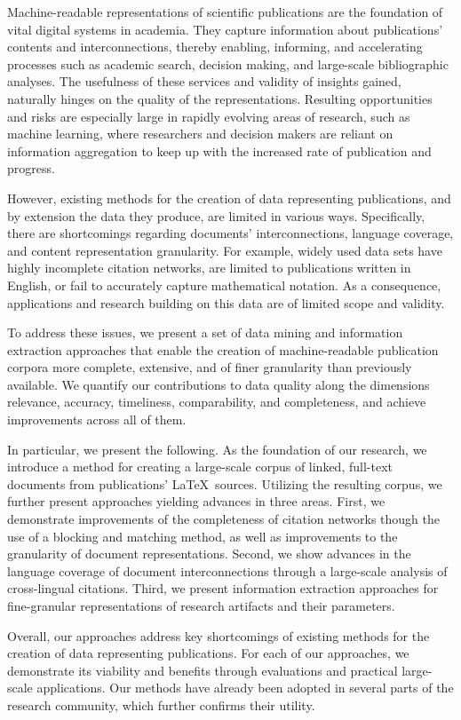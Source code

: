 \Abstract{}
Machine-readable representations of scientific publications are the foundation of vital digital systems in academia.
They capture information about publications' contents and interconnections, thereby enabling, informing, and accelerating processes such as academic search, decision making, and large-scale bibliographic analyses.
The usefulness of these services and validity of insights gained, naturally hinges on the quality of the representations.
Resulting opportunities and risks are especially large in rapidly evolving areas of research, such as machine learning, where researchers and decision makers are reliant on information aggregation to keep up with the increased rate of publication and progress.

However, existing methods for the creation of data representing publications, and by extension the data they produce, are limited in various ways. Specifically, there are shortcomings regarding documents' interconnections, language coverage, and content representation granularity. For example, widely used data sets have highly incomplete citation networks, are limited to publications written in English, or fail to accurately capture mathematical notation. As a consequence, applications and research building on this data are of limited scope and validity.

To address these issues, we present a set of data mining and information extraction approaches that enable the creation of machine-readable publication corpora more complete, extensive, and of finer granularity than previously available. We quantify our contributions to data quality along the dimensions relevance, accuracy, timeliness, comparability, and completeness, and achieve improvements across all of them.

In particular, we present the following.
As the foundation of our research, we introduce a method for creating a large-scale corpus of linked, full-text documents from publications' \LaTeX\ sources.
Utilizing the resulting corpus, we further present approaches yielding advances in three areas.
First, we demonstrate improvements of the completeness of citation networks though the use of a blocking and matching method, as well as improvements to the granularity of document representations.
Second, we show advances in the language coverage of document interconnections through a large-scale analysis of cross-lingual citations.
Third, we present information extraction approaches for fine-granular representations of research artifacts and their parameters.

Overall, our approaches address key shortcomings of existing methods for the creation of data representing publications.
For each of our approaches, we demonstrate its viability and benefits through evaluations and practical large-scale applications.
Our methods have already been adopted in several parts of the research community, which further confirms their utility.
